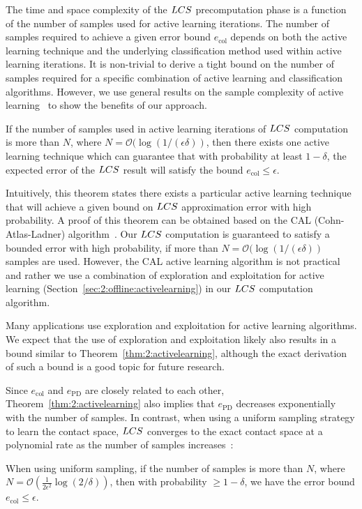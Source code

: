 The time and space complexity of the $LCS$ precomputation phase is a function of
the number of samples used for active learning iterations. The number of samples required to achieve a given error bound $e_{\text{col}}$ depends on both the active learning technique and the underlying classification method used within active learning iterations. It is non-trivial to derive a tight bound on the number of samples required for a specific combination of active learning and classification algorithms. However, we use general results on the sample complexity of active learning~\cite{Hanneke:2013} to show the benefits of our approach.
\begin{theorem}
\label{thm:2:activelearning}
If the number of samples used in active learning iterations of $LCS$ computation is more than $N$,
where $N=\mathcal O(\log(1/(\epsilon \delta))$, then there exists one active learning technique which can guarantee that with probability at least $1-\delta$, the expected error of the $LCS$ result will satisfy the bound $e_{\text{col}}\leq\epsilon$.
\end{theorem}

Intuitively, this theorem states there exists a particular active learning technique that will achieve a given bound on $LCS$ approximation error with high probability.
A proof of this theorem can be obtained based on the CAL (Cohn-Atlas-Ladner) algorithm~\cite{Cohn:ML:1994}. Our $LCS$ computation is guaranteed to satisfy a bounded error with high probability, if more than $N=\mathcal O(\log(1/(\epsilon \delta))$ samples are used. However, the CAL active learning algorithm is not practical~\cite{Hanneke:2013} and rather we use a combination of exploration and exploitation for active learning (Section~\ref{sec:2:offline:activelearning}) in our $LCS$ computation algorithm.

Many applications use exploration and exploitation for active learning algorithms. We expect that the use of exploration and exploitation likely also results in a bound similar to Theorem~\ref{thm:2:activelearning}, although the exact derivation of such a bound is a good topic for future research.

Since $e_{\text{col}}$ and $e_{\text{PD}}$ are closely related to each other, Theorem~\ref{thm:2:activelearning} also implies that
$e_{\text{PD}}$ decreases exponentially with the number of samples.
In contrast, when using a uniform sampling strategy to learn the contact space, 
$LCS$ converges to the
exact contact space
at a polynomial rate as the number of samples
increases~\cite{Mohri:2012:FML}:
\begin{theorem}
\label{thm:2:uniform}
When using uniform sampling, if the number of samples is more than $N$, where $N = \mathcal O(
\frac{1}{2\epsilon^2} \log(2/\delta))$, then
with probability $\geq 1- \delta$, we have the error bound $e_{\text{col}} \leq
\epsilon$.
\end{theorem}

